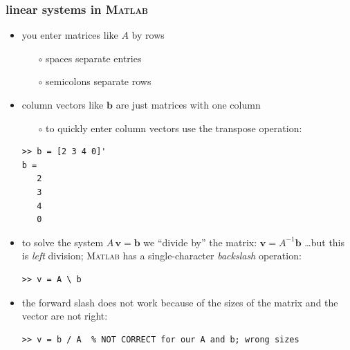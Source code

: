 \documentclass[10pt,hyperref]{beamer}
\newcommand{\bb}{\mathbf{b}}
\newcommand{\bv}{\mathbf{v}}
\newcommand{\Matlab}{\textsc{Matlab}\xspace}
\newcommand{\MO}{\Matlab}
\begin{document}
\begin{frame}[fragile]
\frametitle{linear systems in \MO}

\begin{itemize}
\item you enter matrices like $A$ by rows
  \begin{itemize}
  \item[$\circ$] spaces separate entries
  \item[$\circ$] semicolons separate rows
  \end{itemize}
\item column vectors like $\bb$ are just matrices with one column
  \begin{itemize}
  \item[$\circ$] to quickly enter column vectors use the transpose operation:
  \end{itemize}
\begin{Verbatim}[frame=single,fontfamily=courier,fontsize=\scriptsize]
>> b = [2 3 4 0]'
b =
   2
   3
   4
   0
\end{Verbatim}
\item to solve the system $A\, \bv = \bb$ we ``divide by'' the matrix: $\bv = A^{-1} \bb$ \dots but this is \emph{left} division; \MO has a single-character \emph{backslash} operation:
\begin{Verbatim}[frame=single,fontfamily=courier,fontsize=\scriptsize]
>> v = A \ b
\end{Verbatim}

\bigskip
\scriptsize
\item the forward slash does not work because of the sizes of the matrix and the vector are not right:
\begin{Verbatim}[frame=single,fontfamily=courier,fontsize=\scriptsize]
>> v = b / A  % NOT CORRECT for our A and b; wrong sizes
\end{Verbatim}
\end{itemize}
\end{frame}
\end{document}
